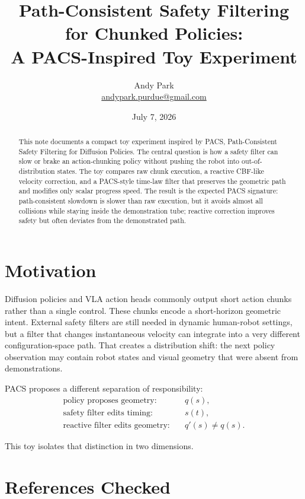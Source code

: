 \documentclass[11pt]{article}
\title{Path-Consistent Safety Filtering for Chunked Policies:\\A PACS-Inspired Toy Experiment}
\author{Andy Park\\\href{mailto:andypark.purdue@gmail.com}{andypark.purdue@gmail.com}}
\date{July 7, 2026}
\begin{document}
\maketitle

\begin{abstract}
This note documents a compact toy experiment inspired by PACS, Path-Consistent Safety Filtering for Diffusion Policies. The central question is how a safety filter can slow or brake an action-chunking policy without pushing the robot into out-of-distribution states. The toy compares raw chunk execution, a reactive CBF-like velocity correction, and a PACS-style time-law filter that preserves the geometric path and modifies only scalar progress speed. The result is the expected PACS signature: path-consistent slowdown is slower than raw execution, but it avoids almost all collisions while staying inside the demonstration tube; reactive correction improves safety but often deviates from the demonstrated path.
\end{abstract}

\section{Motivation}

Diffusion policies and VLA action heads commonly output short action chunks rather than a single control. These chunks encode a short-horizon geometric intent. External safety filters are still needed in dynamic human-robot settings, but a filter that changes instantaneous velocity can integrate into a very different configuration-space path. That creates a distribution shift: the next policy observation may contain robot states and visual geometry that were absent from demonstrations.

PACS proposes a different separation of responsibility:
\begin{align*}
  \text{policy proposes geometry:} \quad & q(s), \\
  \text{safety filter edits timing:} \quad & s(t), \\
  \text{reactive filter edits geometry:} \quad & q'(s) \neq q(s).
\end{align*}

This toy isolates that distinction in two dimensions.

\section{References Checked}
\end{document}
